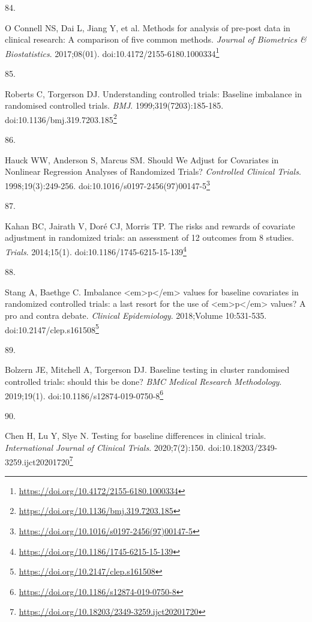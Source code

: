 \documentclass[
]{book}
\newlength{\cslhangindent}
\newlength{\csllabelwidth}
\newlength{\cslentryspacingunit} %
\newenvironment{CSLReferences}[2] %
 {%
  \setlength{\parindent}{0pt}
  \ifodd #1
  \let\oldpar\par
  \def\par{\hangindent=\cslhangindent\oldpar}
  \fi
  \setlength{\parskip}{#2\cslentryspacingunit}
 }%
 {}
\newcommand{\CSLLeftMargin}[1]{\parbox[t]{\csllabelwidth}{#1}}
\newcommand{\CSLRightInline}[1]{\parbox[t]{\linewidth - \csllabelwidth}{#1}\break}
\renewcommand{\href}[2]{#2\footnote{\url{#1}}}
\begin{document}
\begin{CSLReferences}{0}{0}
\leavevmode{}%
\CSLLeftMargin{84. }%
\CSLRightInline{O Connell NS, Dai L, Jiang Y, et al. Methods for analysis of pre-post data in clinical research: A comparison of five common methods. \emph{Journal of Biometrics \& Biostatistics}. 2017;08(01). doi:\href{https://doi.org/10.4172/2155-6180.1000334}{10.4172/2155-6180.1000334}}

\leavevmode{}%
\CSLLeftMargin{85. }%
\CSLRightInline{Roberts C, Torgerson DJ. Understanding controlled trials: Baseline imbalance in randomised controlled trials. \emph{BMJ}. 1999;319(7203):185-185. doi:\href{https://doi.org/10.1136/bmj.319.7203.185}{10.1136/bmj.319.7203.185}}

\leavevmode{}%
\CSLLeftMargin{86. }%
\CSLRightInline{Hauck WW, Anderson S, Marcus SM. Should We Adjust for Covariates in Nonlinear Regression Analyses of Randomized Trials? \emph{Controlled Clinical Trials}. 1998;19(3):249-256. doi:\href{https://doi.org/10.1016/s0197-2456(97)00147-5}{10.1016/s0197-2456(97)00147-5}}

\leavevmode{}%
\CSLLeftMargin{87. }%
\CSLRightInline{Kahan BC, Jairath V, Doré CJ, Morris TP. The risks and rewards of covariate adjustment in randomized trials: an assessment of 12 outcomes from 8 studies. \emph{Trials}. 2014;15(1). doi:\href{https://doi.org/10.1186/1745-6215-15-139}{10.1186/1745-6215-15-139}}

\leavevmode{}%
\CSLLeftMargin{88. }%
\CSLRightInline{Stang A, Baethge C. Imbalance \textless em\textgreater p\textless/em\textgreater{} values for baseline covariates in randomized controlled trials: a last resort for the use of \textless em\textgreater p\textless/em\textgreater{} values? A pro and contra debate. \emph{Clinical Epidemiology}. 2018;Volume 10:531-535. doi:\href{https://doi.org/10.2147/clep.s161508}{10.2147/clep.s161508}}

\leavevmode{}%
\CSLLeftMargin{89. }%
\CSLRightInline{Bolzern JE, Mitchell A, Torgerson DJ. Baseline testing in cluster randomised controlled trials: should this be done? \emph{BMC Medical Research Methodology}. 2019;19(1). doi:\href{https://doi.org/10.1186/s12874-019-0750-8}{10.1186/s12874-019-0750-8}}

\leavevmode{}%
\CSLLeftMargin{90. }%
\CSLRightInline{Chen H, Lu Y, Slye N. Testing for baseline differences in clinical trials. \emph{International Journal of Clinical Trials}. 2020;7(2):150. doi:\href{https://doi.org/10.18203/2349-3259.ijct20201720}{10.18203/2349-3259.ijct20201720}}


\end{CSLReferences}
\end{document}
